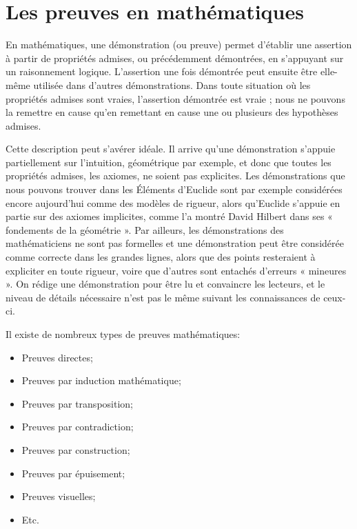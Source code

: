 \documentclass[]{book}
\providecommand{\tightlist}{%
  \setlength{\itemsep}{0pt}\setlength{\parskip}{0pt}}
\theoremstyle{definition}
\theoremstyle{definition}
\theoremstyle{definition}
\theoremstyle{remark}
\begin{document}
\hypertarget{preuves}{%
\chapter{Les preuves en mathématiques}\label{preuves}}

En mathématiques, une démonstration (ou preuve) permet d'établir une assertion à partir de propriétés admises, ou précédemment démontrées, en s'appuyant sur un raisonnement logique. L'assertion une fois démontrée peut ensuite être elle-même utilisée dans d'autres démonstrations. Dans toute situation où les propriétés admises sont vraies, l'assertion démontrée est vraie ; nous ne pouvons la remettre en cause qu'en remettant en cause une ou plusieurs des hypothèses admises.

Cette description peut s'avérer idéale. Il arrive qu'une démonstration s'appuie partiellement sur l'intuition, géométrique par exemple, et donc que toutes les propriétés admises, les axiomes, ne soient pas explicites. Les démonstrations que nous pouvons trouver dans les Éléments d'Euclide sont par exemple considérées encore aujourd'hui comme des modèles de rigueur, alors qu'Euclide s'appuie en partie sur des axiomes implicites, comme l'a montré David Hilbert dans ses « fondements de la géométrie ». Par ailleurs, les démonstrations des mathématiciens ne sont pas formelles et une démonstration peut être considérée comme correcte dans les grandes lignes, alors que des points resteraient à expliciter en toute rigueur, voire que d'autres sont entachés d'erreurs « mineures ». On rédige une démonstration pour être lu et convaincre les lecteurs, et le niveau de détails nécessaire n'est pas le même suivant les connaissances de ceux-ci.

Il existe de nombreux types de preuves mathématiques:

\begin{itemize}
\tightlist
\item
  Preuves directes;
\item
  Preuves par induction mathématique;
\item
  Preuves par transposition;
\item
  Preuves par contradiction;
\item
  Preuves par construction;
\item
  Preuves par épuisement;
\item
  Preuves visuelles;
\item
  Etc.
\end{itemize}
\end{document}
